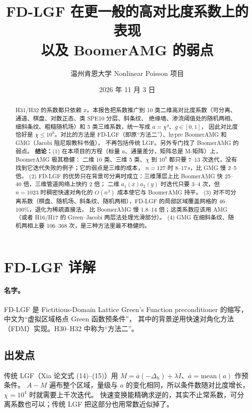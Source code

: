 \documentclass[11pt,a4paper]{ctexart}
\title{FD-LGF 在更一般的高对比度系数上的表现\\以及 BoomerAMG 的弱点}
\author{温州肯恩大学 \quad Nonlinear Poisson 项目}
\date{2026 年 11 月 3 日}
\begin{document}
\maketitle

\begin{abstract}
H31/H32 的系数都只依赖 $x$。本报告把系数推广到 10 类二维高对比度系数（可分离、通道、棋盘、对数正态、类 SPE10 分层、斜条纹、
绝缘墙、渗流阈值处的随机两相、细斜条纹、粗糙随机场）和 5 类三维系数，统一写成 $a=\chi^{g}$、$g\in[0,1]$，
因此对比度恰好是 $\chi\le10^8$。对比的方法是 FD-LGF（即原“方法二”）、hypre BoomerAMG 和 GMG（Jacobi 阻尼取教科书值），
不再包括传统 LGF。另外专门找了 BoomerAMG 的弱点。
\textbf{结论：}(1) 在本项目的方程（标量 $a$、通量差分，矩阵总是 M-矩阵）上，BoomerAMG 极其稳健：
二维 10 类、三维 5 类、$\chi$ 到 $10^8$ 都只要 7--13 次迭代，没有找到它迭代失败的例子；它的弱点是三维的成本，
$n=127$ 时 8--17\,s，比 GMG 慢 2--5 倍。
(2) FD-LGF 的优势只在背景可分离时成立：三维薄层上比 BoomerAMG 快 25--40 倍，三维管道网络上快约 2 倍；
二维 $a_1(x)a_2(y)$ 时迭代只要 3--4 次，但 $n=1023$ 时稠密快速对角化的 $O(n^3)$ 成本使它与 BoomerAMG 持平。
(3) 对不可分离系数（棋盘、随机场、斜条纹、随机两相），FD-LGF 的局部区域覆盖网格的 46--100\%，退化为稀疏直接法，
比 BoomerAMG 慢 1.8--14 倍；这类系数应该用 AMG（或者 H16/H17 的 Green--Jacobi 两层法处理光滑部分）。
(4) GMG 在细斜条纹、随机两相上要 106--368 次，是三种方法里最不稳健的。
\end{abstract}

\tableofcontents

\section{FD-LGF 详解}
\paragraph{名字。}FD-LGF 是 Fictitious-Domain Lattice Green's Function preconditioner 的缩写，中文为“虚拟区域格点 Green 函数预条件”，
其中的背景逆用快速对角化方法（FDM）实现。H30--H32 中称为“方法二”。

\subsection{出发点}
传统 LGF（Xia 论文式 (14)--(15)）用 $M=\bar a(-\Delta_h)+\lambda I$、$\bar a=\mathrm{mean}(a)$ 作预条件。
$A-M$ 遍布整个区域，量级与 $a$ 的变化相同，所以条件数随对比度增长，$\chi=10^4$ 时就需要上千次迭代。
快速变换能精确求逆的，其实不止常系数，可分离系数也可以；传统 LGF 把这部分也用常数近似掉了。
\end{document}
